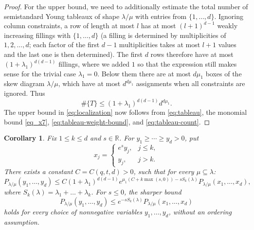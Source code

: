 \documentclass[11pt,reqno]{amsart}
\newtheorem{corollary}[theorem]{Corollary}
\theoremstyle{definition}
\theoremstyle{remark}
\numberwithin{equation}{section}
\newcommand{\R}{\mathbb R}
\begin{document}
\begin{proof}
For the upper bound, we need to additionally estimate the total number of semistandard Young tableaux of shape $\lambda/\mu$ with entries from $\{1,\dots,d\}$. Ignoring column constraints, a row of length at most $l$ has at most
$(l+1)^{d-1}$ weakly increasing fillings with $\{1,\dots,d\}$ (a filling is determined by multiplicities of $1,2,\dots,d$; each factor of the first $d-1$ multiplicities takes at most $l+1$ values and the last one is then determined).
The first $d$ rows therefore have at most $(1+\lambda_1)^{d(d-1)}$ fillings, where we added $1$ so that the expression still makes sense for the trivial case $\lambda_1=0$.
Below them there are at most $d\mu_1$ boxes of the skew diagram $\lambda/\mu$, which have at most
$d^{d\mu_1}$ assignments when all constraints are ignored. Thus
\begin{equation}\label{eq:tableau-count}
 \#\{T\}\le (1+\lambda_1)^{d(d-1)}d^{d\mu_1}.
\end{equation}
The upper bound in \eqref{eq:localization} now follows from
\eqref{eq:tableau}, the monomial bound \eqref{eq_x7}, \eqref{eq:tableau-weight-bound},
and \eqref{eq:tableau-count}. 
\end{proof}

\begin{corollary}\label{Corollary_tilt}
Fix $1\le k\le d$ and $s\in\R$. For $y_1\ge\cdots\ge y_d>0$, put
\[
 x_j=
 \begin{cases}
 e^sy_j,&j\le k,\\
 y_j,&j>k.
 \end{cases}
\]
There exists a constant $C=C(q,t,d)>0$, such that 
for every $\mu\subseteq\lambda$:
\begin{equation}\label{eq:tilt}
 P_{\lambda/\mu}(y_1,\dots,y_d)
 \le C (1+\lambda_1)^{d(d-1)}
       e^{\mu_1(C+k\max(s,0))-sS_k(\lambda)}P_{\lambda/\mu}(x_1,\dots,x_d),
\end{equation}
where $S_k(\lambda)=\lambda_1+\dots+\lambda_k$.
For $s\le0$, the sharper bound
\begin{equation}\label{eq:negative-tilt}
 P_{\lambda/\mu}(y_1,\dots,y_d)
 \le e^{-sS_k(\lambda)}P_{\lambda/\mu}(x_1,\dots,x_d)
\end{equation}
holds for every choice of nonnegative variables $y_1,\dots,y_d$, without an ordering assumption.
\end{corollary}
\end{document}
